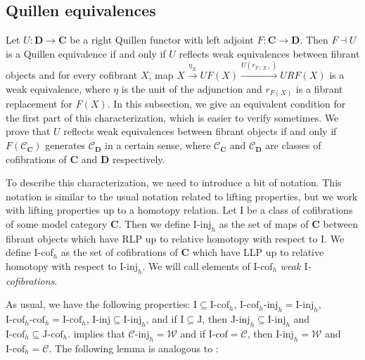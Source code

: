 \documentclass{tac}
\theoremstyle{definition}
\newcommand{\we}{\mathcal{W}}
\newcommand{\cof}{\mathcal{C}}
\newcommand{\cat}[1]{\mathbf{#1}}
\newcommand{\C}{\cat{C}}
\newcommand{\D}{\cat{D}}
\newcommand{\I}{\mathrm{I}}
\newcommand{\J}{\mathrm{J}}
\newcommand{\class}[2]{#1\text{-}\mathrm{#2}}
\newcommand{\Iinj}[1][\I]{\class{#1}{inj}}
\newcommand{\Icof}[1][\I]{\class{#1}{cof}}
\newcommand{\Jinj}[1][]{\Iinj[\J#1]}
\newcommand{\Jcof}[1][]{\Icof[\J#1]}
\begin{document}
\subsection{Quillen equivalences}

Let $U : \D \to \C$ be a right Quillen functor with left adjoint $F : \C \to \D$.
Then $F \dashv U$ is a Quillen equivalence if and only if $U$ reflects weak equivalences between fibrant objects and
for every cofibrant $X$, map $X \xrightarrow{\eta_X} UF(X) \xrightarrow{U(r_{F(X)})} URF(X)$ is a weak equivalence,
where $\eta$ is the unit of the adjunction and $r_{F(X)}$ is a fibrant replacement for $F(X)$.
In this subsection, we give an equivalent condition for the first part of this characterization, which is easier to verify sometimes.
We prove that $U$ reflects weak equivalences between fibrant objects if and only if $F(\cof_\C)$ generates $\cof_\D$ in a certain sense,
where $\cof_\C$ and $\cof_\D$ are classes of cofibrations of $\C$ and $\D$ respectively.

To describe this characterization, we need to introduce a bit of notation.
This notation is similar to the usual notation related to lifting properties, but we work with lifting properties up to a homotopy relation.
Let $\I$ be a class of cofibrations of some model category $\C$.
Then we define $\Iinj_h$ as the set of maps of $\C$ between fibrant objects which have RLP up to relative homotopy with respect to $\I$.
We define $\Icof_h$ as the set of cofibrations of $\C$ which have LLP up to relative homotopy with respect to $\Iinj_h$.
We will call elements of $\Icof_h$ \emph{weak $\I$-cofibrations}.

As usual, we have the following properties: $\I \subseteq \Icof_h$, $\Iinj[\Icof_h]_h = \Iinj_h$, $\Icof[\Icof_h]_h = \Icof_h$, $\Iinj \subseteq \Iinj_h$,
and if $\I \subseteq \J$, then $\Jinj_h \subseteq \Iinj_h$ and $\Icof_h \subseteq \Jcof_h$.
 implies that $\Iinj[\cof]_h = \we$ and if $\Icof = \cof$, then $\Iinj_h = \we$ and $\Icof_h = \cof$.
The following lemma is analogous to \cite[Lemma~2.1.8]{hovey}:
\end{document}
